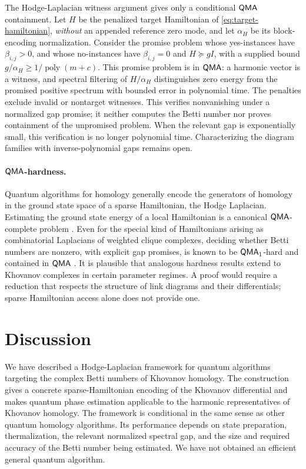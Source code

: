 \documentclass[a4paper,onecolumn,unpublished]{quantumarticle}
\theoremstyle{plain}
\theoremstyle{definition}
\theoremstyle{definition}
\numberwithin{equation}{section}
\begin{document}
The Hodge-Laplacian witness argument gives only a conditional \(\mathsf{QMA}\) containment. Let \(H\) be the penalized target Hamiltonian of \cref{eq:target-hamiltonian}, \emph{without} an appended reference zero mode, and let \(\alpha_H\) be its block-encoding normalization. Consider the promise problem whose yes-instances have \(\beta_{i,j}>0\), and whose no-instances have \(\beta_{i,j}=0\) and \(H\succeq gI\), with a supplied bound \(g/\alpha_H\ge1/\operatorname{poly}(m+c)\). This promise problem is in \(\mathsf{QMA}\): a harmonic vector is a witness, and spectral filtering of \(H/\alpha_H\) distinguishes zero energy from the promised positive spectrum with bounded error in polynomial time. The penalties exclude invalid or nontarget witnesses. This verifies nonvanishing under a normalized gap promise; it neither computes the Betti number nor proves containment of the unpromised problem. When the relevant gap is exponentially small, this verification is no longer polynomial time. Characterizing the diagram families with inverse-polynomial gaps remains open.

\paragraph{\(\mathsf{QMA}\)-hardness.}
Quantum algorithms for homology generally encode the generators of homology in the ground state space of a sparse Hamiltonian, the Hodge Laplacian. Estimating the ground state energy of a local Hamiltonian is a canonical \(\mathsf{QMA}\)-complete problem \cite{kitaev2002classical,bookatz2012qma}. Even for the special kind of Hamiltonians arising as combinatorial Laplacians of weighted clique complexes, deciding whether Betti numbers are nonzero, with explicit gap promises, is known to be \(\mathsf{QMA}_1\)-hard and contained in \(\mathsf{QMA}\) \cite{crichigno2022clique,king2023gapped}. It is plausible that analogous hardness results extend to Khovanov complexes in certain parameter regimes. A proof would require a reduction that respects the structure of link diagrams and their differentials; sparse Hamiltonian access alone does not provide one.


\section{Discussion}\label{sec:discussion}

We have described a Hodge-Laplacian framework for quantum algorithms targeting the complex Betti numbers of Khovanov homology.  The construction gives a concrete sparse-Hamiltonian encoding of the Khovanov differential and makes quantum phase estimation applicable to the harmonic representatives of Khovanov homology.  The framework is conditional in the same sense as other quantum homology algorithms.  Its performance depends on state preparation, thermalization, the relevant normalized spectral gap, and the size and required accuracy of the Betti number being estimated. We have not obtained an efficient general quantum algorithm.
\end{document}
